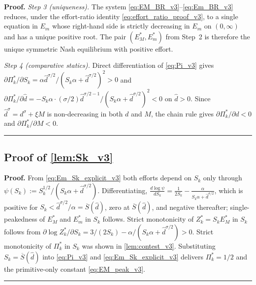 \documentclass[11pt,twoside]{extarticle}
\newenvironment{proof}[1][Proof]{\noindent \textbf{#1.} }{\ \rule{0.5em}{0.5em}}
\begin{document}
\begin{proof}
\emph{Step 3 (uniqueness).} The system \eqref{eq:EM_BR_v3}--\eqref{eq:Em_BR_v3} reduces, under the effort-ratio identity \eqref{eq:effort_ratio_proof_v3}, to a single equation in $E_m$ whose right-hand side is strictly decreasing in $E_m$ on $(0,\infty)$ and has a unique positive root. The pair $(E_M^*,E_m^*)$ from Step~2 is therefore the unique symmetric Nash equilibrium with positive effort.

\emph{Step 4 (comparative statics).} Direct differentiation of \eqref{eq:Pi_v3} gives
$\partial\Pi_k^*/\partial S_k=\alpha\hat d^{\sigma/2}/(S_k\alpha+\hat d^{\sigma/2})^2>0$ and $\partial\Pi_k^*/\partial\hat d=-S_k\alpha\cdot(\sigma/2)\hat d^{\sigma/2-1}/(S_k\alpha+\hat d^{\sigma/2})^2<0$ on $\hat d>0$. Since $\hat d^\sigma=d^\sigma+\xi M$ is non-decreasing in both $d$ and $M$, the chain rule gives $\partial\Pi_k^*/\partial d<0$ and $\partial\Pi_k^*/\partial M<0$.
\end{proof}

\subsection*{Proof of \autoref{lem:Sk_v3}} \label{app:proof:Sk_v3}
\begin{proof}
From \eqref{eq:Em_Sk_explicit_v3} both efforts depend on $S_k$ only through $\psi(S_k):=S_k^{1/2}/(S_k\alpha+\hat d^{\sigma/2})$. Differentiating, $\frac{d\log\psi}{dS_k}=\frac{1}{2S_k}-\frac{\alpha}{S_k\alpha+\hat d^{\sigma/2}}$, which is positive for $S_k<\hat d^{\sigma/2}/\alpha=\overline S(\hat d)$, zero at $\overline S(\hat d)$, and negative thereafter; single-peakedness of $E_M^*$ and $E_m^*$ in $S_k$ follows. Strict monotonicity of $Z_k^*=S_kE_M^*$ in $S_k$ follows from $\partial\log Z_k^*/\partial S_k=3/(2S_k)-\alpha/(S_k\alpha+\hat d^{\sigma/2})>0$. Strict monotonicity of $\Pi_k^*$ in $S_k$ was shown in \autoref{lem:contest_v3}. Substituting $S_k=\overline S(\hat d)$ into \eqref{eq:Pi_v3} and \eqref{eq:Em_Sk_explicit_v3} delivers $\Pi_k^*=1/2$ and the primitive-only constant \eqref{eq:EM_peak_v3}.
\end{proof}
\end{document}
